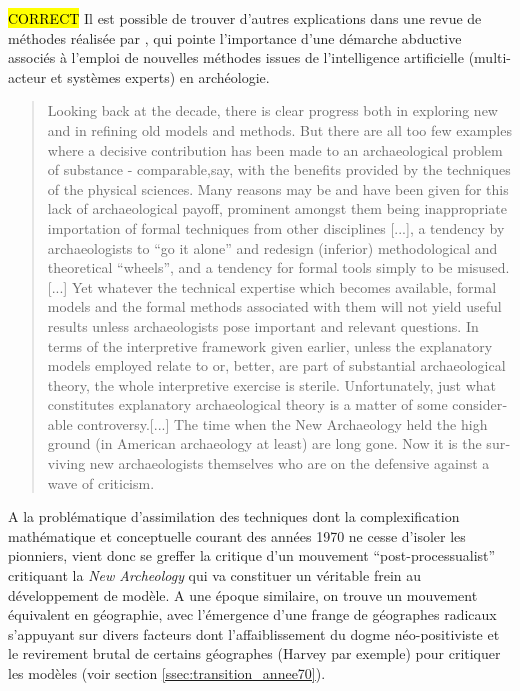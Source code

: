 \hl{CORRECT}
Il est possible de trouver d'autres explications dans une revue de méthodes réalisée par \textcite{Doran1986}, qui pointe l'importance d'une démarche abductive associés à l'emploi de nouvelles méthodes \autocite{Doran1982} issues de l'intelligence artificielle (multi-acteur et systèmes experts) en archéologie.

\foreignblockquote{english}[\cite{Doran1986}]{Looking back at the decade, there is clear progress both in exploring new and in refining old models and methods. But there are all too few examples where a decisive contribution has been made to an archaeological problem of substance - comparable,say, with the benefits provided by the techniques of the physical sciences. Many reasons may be and have been given for this lack of archaeological payoff, prominent amongst them being inappropriate importation of formal techniques from other disciplines [...], a tendency by archaeologists to \enquote{go it alone} and redesign (inferior) methodological and theoretical \enquote{wheels}, and a tendency for formal tools simply to be misused. [...] Yet whatever the technical expertise which becomes available, formal models and the formal methods associated with them will not yield useful results unless archaeologists pose important and relevant questions. In terms of the interpretive framework given earlier, unless the explanatory models employed relate to or, better, are part of substantial archaeological theory, the whole interpretive exercise is sterile. Unfortunately, just what constitutes explanatory archaeological theory is a matter of some considerable controversy.[...] The time when the New Archaeology held the high ground (in American archaeology at least) are long gone. Now it is the surviving new archaeologists themselves who are on the defensive against a wave of criticism.}

A la problématique d'assimilation des techniques dont la complexification mathématique et conceptuelle courant des années 1970 ne cesse d'isoler les pionniers, vient donc se greffer la critique d'un mouvement \foreignquote{english}{post-processualist} critiquant la \textit{New Archeology} qui va constituer un véritable frein au développement de modèle. A une époque similaire, on trouve un mouvement équivalent en géographie, avec l'émergence d'une frange de géographes radicaux s'appuyant sur divers facteurs dont l'affaiblissement du dogme néo-positiviste et le revirement brutal de certains géographes (Harvey par exemple) pour critiquer les modèles (voir section \ref{ssec:transition_annee70}).

